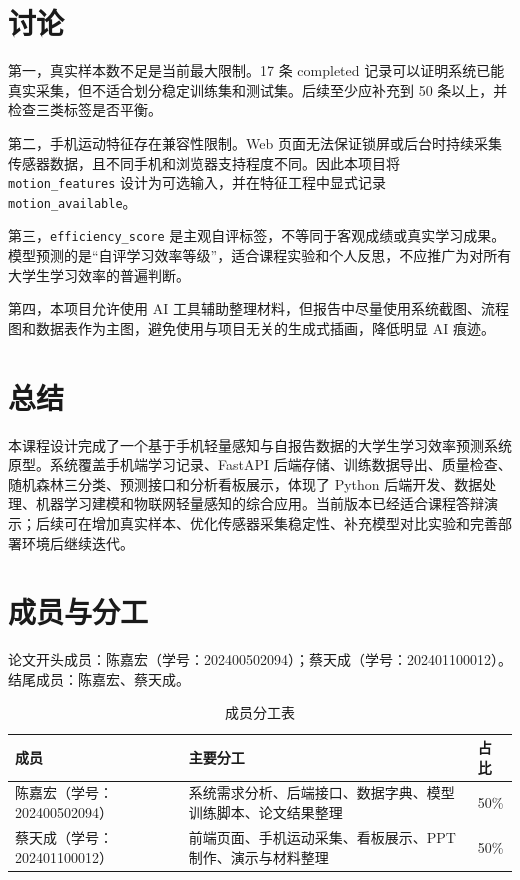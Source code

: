 \documentclass[UTF8,a4paper,fontset=fandol]{ctexart}
\newcommand{\memberone}{陈嘉宏（学号：202400502094）}
\newcommand{\membertwo}{蔡天成（学号：202401100012）}
\begin{document}
\section{讨论}

第一，真实样本数不足是当前最大限制。17 条 completed 记录可以证明系统已能真实采集，但不适合划分稳定训练集和测试集。后续至少应补充到 50 条以上，并检查三类标签是否平衡。

第二，手机运动特征存在兼容性限制。Web 页面无法保证锁屏或后台时持续采集传感器数据，且不同手机和浏览器支持程度不同。因此本项目将 \texttt{motion\_features} 设计为可选输入，并在特征工程中显式记录 \texttt{motion\_available}。

第三，\texttt{efficiency\_score} 是主观自评标签，不等同于客观成绩或真实学习成果。模型预测的是“自评学习效率等级”，适合课程实验和个人反思，不应推广为对所有大学生学习效率的普遍判断。

第四，本项目允许使用 AI 工具辅助整理材料，但报告中尽量使用系统截图、流程图和数据表作为主图，避免使用与项目无关的生成式插画，降低明显 AI 痕迹。

\section{总结}

本课程设计完成了一个基于手机轻量感知与自报告数据的大学生学习效率预测系统原型。系统覆盖手机端学习记录、FastAPI 后端存储、训练数据导出、质量检查、随机森林三分类、预测接口和分析看板展示，体现了 Python 后端开发、数据处理、机器学习建模和物联网轻量感知的综合应用。当前版本已经适合课程答辩演示；后续可在增加真实样本、优化传感器采集稳定性、补充模型对比实验和完善部署环境后继续迭代。

\section*{成员与分工}

论文开头成员：\memberone；\membertwo。结尾成员：陈嘉宏、蔡天成。

\begin{table}[H]
  \centering
  \caption*{成员分工表}
  \small
  \begin{tabularx}{\linewidth}{p{2.4cm}Xp{1.4cm}}
    \toprule
    成员 & 主要分工 & 占比 \\
    \midrule
    \memberone & 系统需求分析、后端接口、数据字典、模型训练脚本、论文结果整理 & 50\% \\
    \membertwo & 前端页面、手机运动采集、看板展示、PPT 制作、演示与材料整理 & 50\% \\
    \bottomrule
  \end{tabularx}
\end{table}
\end{document}
